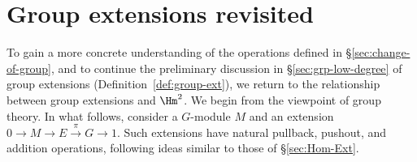 
\section{Group extensions revisited}\label{sec:group-ext-revisited}
\hypertarget{o014.aljabr2.chapter6.group-extensions-revisited}{ }

To gain a more concrete understanding of the operations defined in
\S\ref{sec:change-of-group}, and to continue the preliminary discussion in
\S\ref{sec:grp-low-degree} of group extensions
(Definition~\ref{def:group-ext}), we return to the relationship between group
extensions and $\Hm^2$. We begin from the viewpoint of group theory. In what
follows, consider a $G$-module $M$ and an extension
$0\to M\to E\xrightarrow{\pi}G\to1$. Such extensions have natural pullback,
pushout, and addition operations, following ideas similar to those of
\S\ref{sec:Hom-Ext}.

